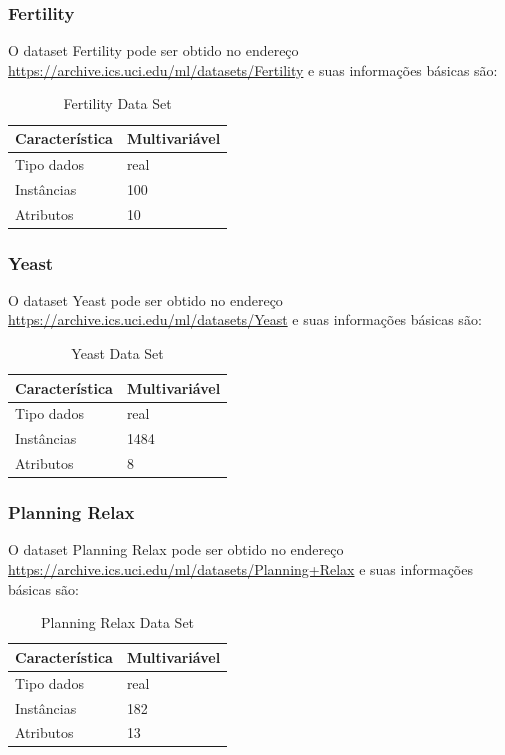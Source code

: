\documentclass[12pt, a4paper, brazil]{article}
\begin{document}
\subsubsection{Fertility}
O dataset Fertility pode ser obtido no endereço \url{https://archive.ics.uci.edu/ml/datasets/Fertility} e suas informações básicas são:
\begin{table}[!ht]
\centering
\caption{Fertility Data Set}
\label{fertilitytable}
\begin{tabular}{|l|l|}
\hline
Característica & Multivariável\\
\hline
Tipo dados & real\\
\hline
Instâncias & 100\\
\hline
Atributos & 10 \\
\hline
\end{tabular}
\end{table}

\subsubsection{Yeast}
O dataset Yeast pode ser obtido no endereço \url{https://archive.ics.uci.edu/ml/datasets/Yeast} e suas informações básicas são:
\begin{table}[!ht]
\centering
\caption{Yeast Data Set}
\label{yeasttable}
\begin{tabular}{|l|l|}
\hline
Característica & Multivariável\\
\hline
Tipo dados & real\\
\hline
Instâncias & 1484\\
\hline
Atributos & 8\\
\hline
\end{tabular}
\end{table}

\subsubsection{Planning Relax}
O dataset Planning Relax pode ser obtido no endereço \url{https://archive.ics.uci.edu/ml/datasets/Planning+Relax} e suas informações básicas são:
\begin{table}[!ht]
\centering
\caption{Planning Relax Data Set}
\label{planningtable}
\begin{tabular}{|l|l|}
\hline
Característica & Multivariável\\
\hline
Tipo dados & real\\
\hline
Instâncias & 182\\
\hline
Atributos & 13\\
\hline
\end{tabular}
\end{table}
\end{document}
